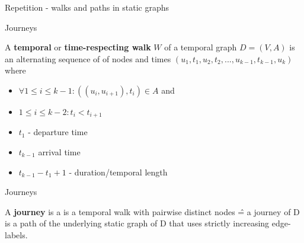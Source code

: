 \documentclass{beamer}
\begin{document}
\begin{frame}{Repetition - walks and paths in static graphs}
  \begin{itemize}
  \end{itemize}
\end{frame}


\begin{frame}{Journeys}
	\begin{tcolorbox}[title=Definition: temporal/time respecting walk]
		A \textbf{temporal} or \textbf{time-respecting walk} $W$ of a temporal graph $D = (V, A)$ is an alternating sequence of of nodes and times $(u_1 , t_1 , u_2 , t_2 , ... , u_{k-1} , t_{k-1} , u_k )$
		where 
		\begin{itemize}
			\item $\forall 1 \leq i \leq k - 1: ((u_i , u_{i+1} ), t_i ) \in A$ and
			\item $1 \leq i \leq k - 2: t_i < t_{i + 1}$
		\end{itemize}
	\end{tcolorbox}
	\begin{itemize}
		\item $t_1$ - departure time
		\item $t_{k - 1}$ arrival time
		\item $t_{k - 1} - t_1 + 1$ - duration/temporal length
	\end{itemize}
\end{frame}

\begin{frame}{Journeys}
	\begin{tcolorbox}[title=Definition: Journey]
		A \textbf{journey} is a is a temporal walk with pairwise distinct nodes \^{=} a journey of D is a path of the underlying static graph of D that uses
strictly increasing edge-labels.
	\end{tcolorbox}

\end{frame}
\end{document}
